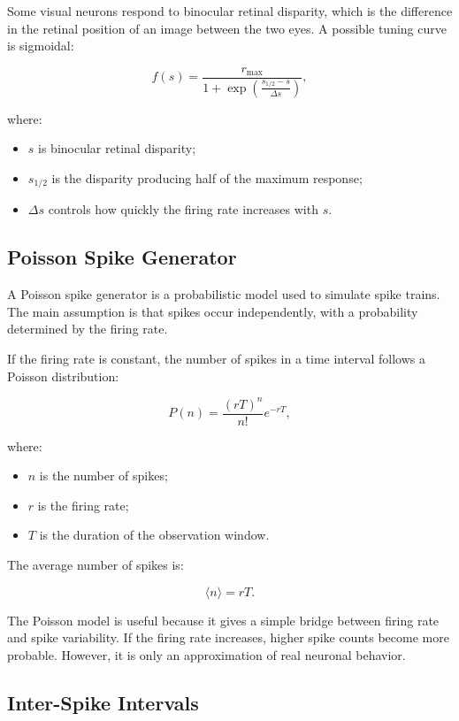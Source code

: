 Some visual neurons respond to binocular retinal disparity, which is the difference in the retinal position of an image between the two eyes. A possible tuning curve is sigmoidal:

\[
f(s)
=
\frac{r_{\max}}
{1 + \exp\left(\frac{s_{1/2} - s}{\Delta s}\right)},
\]

where:

\begin{itemize}[noitemsep]
    \item $s$ is binocular retinal disparity;
    \item $s_{1/2}$ is the disparity producing half of the maximum response;
    \item $\Delta s$ controls how quickly the firing rate increases with $s$.
\end{itemize}

\subsection{Poisson Spike Generator}

A Poisson spike generator is a probabilistic model used to simulate spike trains. The main assumption is that spikes occur independently, with a probability determined by the firing rate.

If the firing rate is constant, the number of spikes in a time interval follows a Poisson distribution:

\[
P(n)
=
\frac{(rT)^n}{n!}
e^{-rT},
\]

where:

\begin{itemize}[noitemsep]
    \item $n$ is the number of spikes;
    \item $r$ is the firing rate;
    \item $T$ is the duration of the observation window.
\end{itemize}

The average number of spikes is:

\[
\langle n \rangle = rT.
\]

\begin{authornote}
The Poisson model is useful because it gives a simple bridge between firing rate and spike variability. If the firing rate increases, higher spike counts become more probable. However, it is only an approximation of real neuronal behavior.
\end{authornote}

\subsection{Inter-Spike Intervals}


